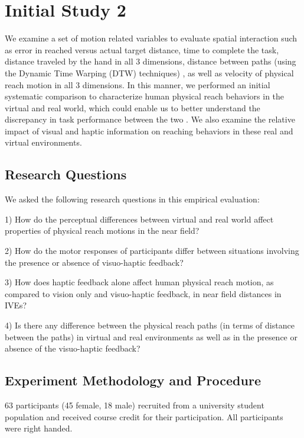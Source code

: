 
\chapter{Initial Study 2}
We examine a set of motion related variables to evaluate spatial interaction such as error in reached versus actual target distance, time to complete the task, distance traveled by the hand in all 3 dimensions, distance between paths (using the Dynamic Time Warping (DTW) techniques) \cite{kr05}, as well as velocity of physical reach motion in all 3 dimensions. In this manner, we performed an initial systematic comparison to characterize human physical reach behaviors in the virtual and real world, which could enable us to better understand the discrepancy in task performance between the two \cite{NAB+11}. We also examine the relative impact of visual and haptic information on reaching behaviors in these real and virtual environments. 

\section{Research Questions}
We asked the following research questions in this empirical evaluation:

1) How do the perceptual differences between virtual and real world affect properties of physical reach motions in the near field?

2) How do the motor responses of participants differ between situations involving the presence or absence of visuo-haptic feedback?

3) How does haptic feedback alone affect human physical reach motion, as compared to vision only and visuo-haptic feedback, in near field distances in IVEs?

4) Is there any difference between the physical reach paths (in terms of distance between the paths) in virtual and real environments as well as in the presence or absence of the visuo-haptic feedback?


\section{Experiment Methodology and Procedure}
63 participants (45 female, 18 male) recruited from a university student population and received course credit for their participation. All participants were right handed.

